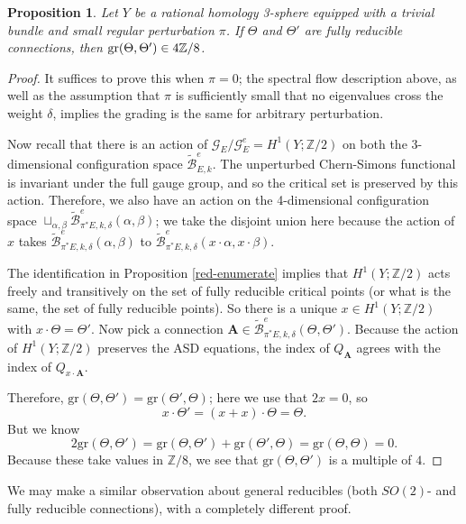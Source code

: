 \documentclass[10pt,a4paper]{amsart}
\newcommand{\pE}{\pi^* \! E}
\newtheorem{proposition}[theorem]{Proposition}
\theoremstyle{definition}
\theoremstyle{remark}
\numberwithin{figure}{qchap}
\begin{document}
\begin{proposition}\label{gr-fullred}Let $Y$ be a rational homology 3-sphere equipped with a trivial bundle and small regular perturbation $\pi$. If $\Theta$ and $\Theta'$ are fully reducible connections, then $\textup{gr}(\Theta, \Theta') \in 4\mathbb Z/8$.
\end{proposition}
\begin{proof}It suffices to prove this when $\pi = 0$; the spectral flow description above, as well as the assumption that $\pi$ is sufficiently small that no eigenvalues cross the weight $\delta$, implies the grading is the same for arbitrary perturbation.

Now recall that there is an action of $\mathcal G_E/\mathcal G^e_E = H^1(Y;\mathbb Z/2)$ on both the 3-dimensional configuration space $\widetilde{\mathcal B}^e_{E,k}$. The unperturbed Chern-Simons functional is invariant under the full gauge group, and so the critical set is preserved by this action. Therefore, we also have an action on the 4-dimensional configuration space $\sqcup_{\alpha, \beta}\widetilde{\mathcal B}^e_{\pE,k,\delta}(\alpha,\beta)$; we take the disjoint union here because the action of $x$ takes $\widetilde{\mathcal B}^e_{\pE,k,\delta}(\alpha,\beta)$ to $\widetilde{\mathcal B}^e_{\pE,k,\delta}(x \cdot \alpha,x \cdot \beta)$.

The identification in Proposition \ref{red-enumerate} implies that $H^1(Y;\mathbb Z/2)$ acts freely and transitively on the set of fully reducible critical points (or what is the same, the set of fully reducible points). So there is a unique $x \in H^1(Y;\mathbb Z/2)$ with $x \cdot \Theta = \Theta'$. Now pick a connection $\mathbf{A} \in \widetilde{\mathcal B}^e_{\pE, k,\delta}(\Theta, \Theta')$. Because the action of $H^1(Y;\mathbb Z/2)$ preserves the ASD equations, the index of $Q_\mathbf{A}$ agrees with the index of $Q_{x \cdot \mathbf{A}}$.

Therefore, $\text{gr}(\Theta, \Theta') = \text{gr}(\Theta', \Theta)$; here we use that $2x = 0$, so 
$$x \cdot \Theta' = (x + x) \cdot \Theta = \Theta.$$ 
But we know $$2\text{gr}(\Theta, \Theta') = \text{gr}(\Theta, \Theta') + \text{gr}(\Theta', \Theta) = \text{gr}(\Theta, \Theta) = 0.$$ Because these take values in $\mathbb Z/8$, we see that $\text{gr}(\Theta, \Theta')$ is a multiple of $4$.
\end{proof}

We may make a similar observation about general reducibles (both $SO(2)$- and fully reducible connections), with a completely different proof.
\end{document}
